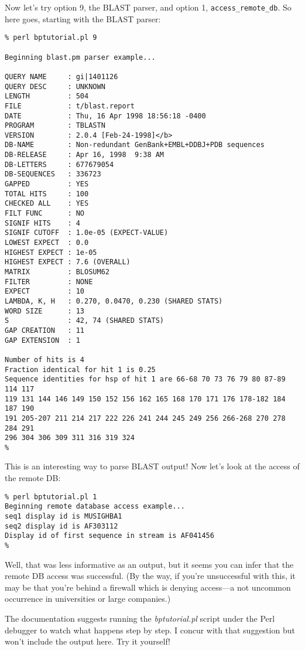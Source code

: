 Now let's try option 9, the BLAST parser, and option 1, \verb|access_remote_db|. So here goes, starting with the BLAST parser: 

\begin{lstlisting}
% perl bptutorial.pl 9

Beginning blast.pm parser example... 

QUERY NAME     : gi|1401126
QUERY DESC     : UNKNOWN
LENGTH         : 504
FILE           : t/blast.report
DATE           : Thu, 16 Apr 1998 18:56:18 -0400
PROGRAM        : TBLASTN
VERSION        : 2.0.4 [Feb-24-1998]</b>
DB-NAME        : Non-redundant GenBank+EMBL+DDBJ+PDB sequences
DB-RELEASE     : Apr 16, 1998  9:38 AM
DB-LETTERS     : 677679054
DB-SEQUENCES   : 336723
GAPPED         : YES
TOTAL HITS     : 100
CHECKED ALL    : YES
FILT FUNC      : NO
SIGNIF HITS    : 4
SIGNIF CUTOFF  : 1.0e-05 (EXPECT-VALUE)
LOWEST EXPECT  : 0.0
HIGHEST EXPECT : 1e-05
HIGHEST EXPECT : 7.6 (OVERALL)
MATRIX         : BLOSUM62
FILTER         : NONE
EXPECT         : 10
LAMBDA, K, H   : 0.270, 0.0470, 0.230 (SHARED STATS)
WORD SIZE      : 13
S              : 42, 74 (SHARED STATS)
GAP CREATION   : 11
GAP EXTENSION  : 1

Number of hits is 4 
Fraction identical for hit 1 is 0.25 
Sequence identities for hsp of hit 1 are 66-68 70 73 76 79 80 87-89 114 117
119 131 144 146 149 150 152 156 162 165 168 170 171 176 178-182 184 187 190
191 205-207 211 214 217 222 226 241 244 245 249 256 266-268 270 278 284 291
296 304 306 309 311 316 319 324 
%
\end{lstlisting}

This is an interesting way to parse BLAST output! Now let's look at the access of the remote DB: 

\begin{lstlisting}
% perl bptutorial.pl 1
Beginning remote database access example... 
seq1 display id is MUSIGHBA1 
seq2 display id is AF303112 
Display id of first sequence in stream is AF041456
% 
\end{lstlisting}

Well, that was less informative as an output, but it seems you can infer that the remote DB access was successful. (By the way, if you're unsuccessful with this, it may be that you're behind a firewall which is denying access—a not uncommon occurrence in universities or large companies.)

The documentation suggests running the \textit{bptutorial.pl} script under the Perl debugger to watch what happens step by step. I concur with that suggestion but won't include the output here. Try it yourself!

